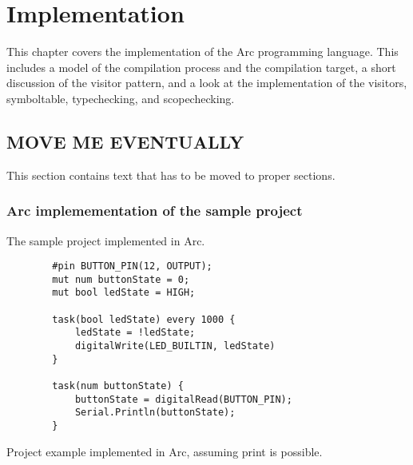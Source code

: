 \chapter{Implementation}\label{cha:implementation}
This chapter covers the implementation of the Arc programming language. This includes a model of the compilation process and the compilation target, a short discussion of the visitor pattern, and a look at the implementation of the visitors, symboltable, typechecking, and scopechecking.











\section{MOVE ME EVENTUALLY}
This section contains text that has to be moved to proper sections.

\subsection*{Arc implemementation of the sample project}
The sample project implemented in Arc.

\begin{listing}[htb!]
    \begin{verbatim}
        #pin BUTTON_PIN(12, OUTPUT);
        mut num buttonState = 0;
        mut bool ledState = HIGH;

        task(bool ledState) every 1000 {
            ledState = !ledState;
            digitalWrite(LED_BUILTIN, ledState)
        }

        task(num buttonState) {
            buttonState = digitalRead(BUTTON_PIN);
            Serial.Println(buttonState);
        }
    \end{verbatim}
    \caption{Project example implemented in Arc, assuming print is possible.}
    \label{lst:arcexample}
\end{listing}
